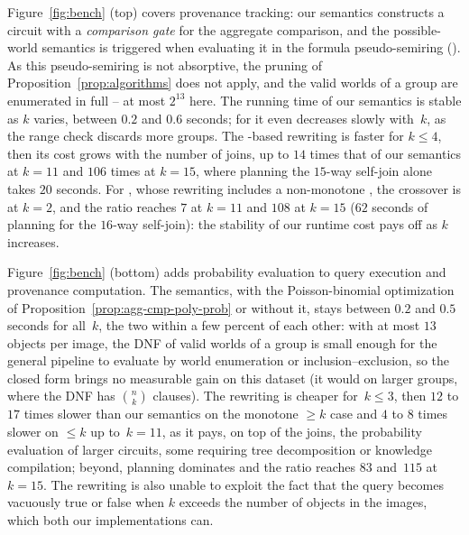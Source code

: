 Figure~\ref{fig:bench} (top) covers provenance tracking: our semantics
constructs a circuit with a \emph{comparison gate} for the aggregate
comparison, and the possible-world semantics is triggered when
evaluating it in the formula pseudo-semiring (). As this
pseudo-semiring is not absorptive, the pruning of
Proposition~\ref{prop:algorithms} does not apply, and the valid worlds
of a group are enumerated in full -- at most $2^{13}$ here. The
running time of our semantics is stable as $k$ varies, between $0.2$
and $0.6$ seconds; for  it even decreases slowly
with~$k$, as the range check discards more groups. The
-based rewriting is faster for $k\leq 4$, then its cost grows
with the number of joins, up to $14$ times that of our semantics at
$k=11$ and $106$ times at $k=15$, where planning the $15$-way self-join
alone takes $20$ seconds. For , whose rewriting
includes a non-monotone , the crossover is at $k=2$, and the
ratio reaches $7$ at $k=11$ and $108$ at $k=15$ ($62$ seconds of
planning for the $16$-way self-join): the stability of our runtime cost
pays off as $k$ increases.

Figure~\ref{fig:bench} (bottom) adds probability evaluation to query
execution and provenance computation.
The  semantics, with the Poisson-binomial optimization of
Proposition~\ref{prop:agg-cmp-poly-prob} or without it, stays between
$0.2$ and $0.5$ seconds for all~$k$, the two within a few percent of
each other: with at most $13$ objects per image, the DNF of valid worlds
of a group is small enough for the general pipeline to evaluate by world
enumeration or inclusion--exclusion, so the closed form brings no
measurable gain on this dataset (it would on larger groups, where the
DNF has $\binom{n}{k}$ clauses). The  rewriting is cheaper
for~$k\leq 3$, then $12$ to $17$ times slower than our semantics on the
monotone $\geq k$ case and $4$ to $8$ times slower on $\leq k$ up
to~$k=11$, as it pays, on top of the joins, the probability evaluation
of larger circuits, some requiring tree decomposition or knowledge
compilation; beyond, planning dominates and the ratio reaches $83$
and~$115$ at $k=15$. The  rewriting is also unable to exploit
the fact that the query becomes vacuously true or false when $k$ exceeds
the number of objects in the images, which both our implementations can.


